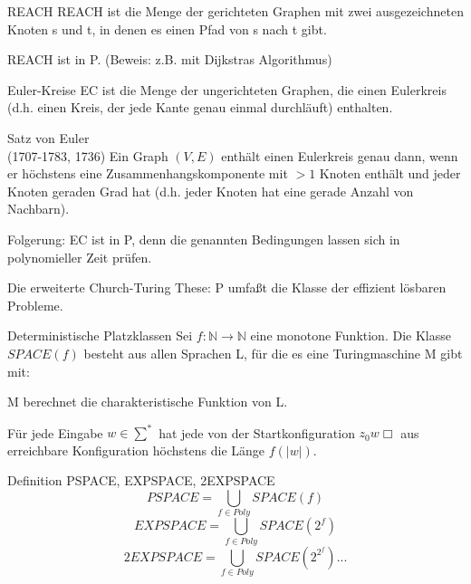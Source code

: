\documentclass[avery5371, frame]{flashcards}
\begin{document}
\begin{flashcard}[Definition]{REACH}
    REACH ist die Menge der gerichteten Graphen mit zwei ausgezeichneten Knoten s und t, in denen es einen Pfad von s nach t gibt.

    REACH ist in P. (Beweis: z.B. mit Dijkstras Algorithmus)
\end{flashcard}

\begin{flashcard}[Definition]{Euler-Kreise}
    EC ist die Menge der ungerichteten Graphen, die einen Eulerkreis (d.h. einen Kreis, der jede Kante genau einmal durchläuft) enthalten.
\end{flashcard}

\begin{flashcard}[Satz]{ Satz von Euler\\ (1707-1783, 1736)}
    Ein Graph $(V,E)$ enthält einen Eulerkreis genau dann, wenn er höchstens eine Zusammenhangskomponente mit $>1$ Knoten enthält und jeder Knoten geraden Grad hat (d.h. jeder Knoten hat eine gerade Anzahl von Nachbarn).

    Folgerung: EC ist in P, denn die genannten Bedingungen lassen sich in polynomieller Zeit prüfen.

    Die erweiterte Church-Turing These: P umfaßt die Klasse der effizient lösbaren Probleme.
\end{flashcard}

\begin{flashcard}[Definition]{Deterministische Platzklassen}
    Sei $f:\mathbb{N}\rightarrow\mathbb{N}$ eine monotone Funktion. Die Klasse $SPACE(f)$ besteht aus allen Sprachen L, für die es eine Turingmaschine M gibt mit:
    \begin{itemize*}
        \item M berechnet die charakteristische Funktion von L.
        \item Für jede Eingabe $w\in\sum^*$ hat jede von der Startkonfiguration $z_0 w\Box$ aus erreichbare Konfiguration höchstens die Länge $f(|w|)$.
    \end{itemize*}
\end{flashcard}

\begin{flashcard}[Definition]{Definition PSPACE, EXPSPACE, 2EXPSPACE}
    $$PSPACE = \bigcup_{f\in Poly} SPACE(f)$$
    $$EXPSPACE = \bigcup_{f\in Poly} SPACE(2^f)$$
    $$2EXPSPACE = \bigcup_{f\in Poly} SPACE(2^{2^{f}})...$$
\end{flashcard}
\end{document}
